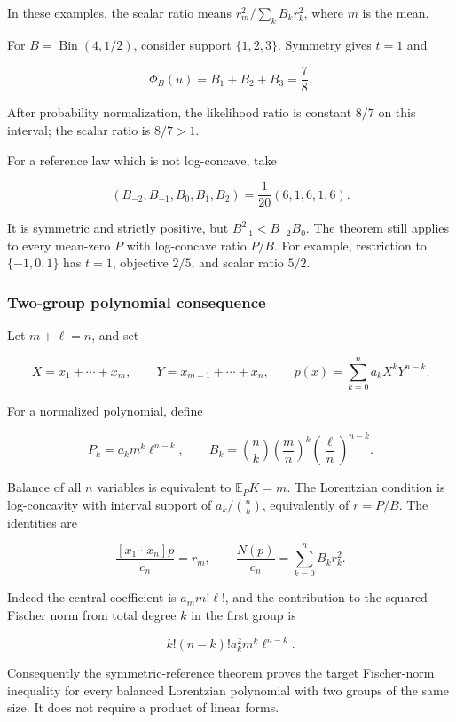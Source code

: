 \documentclass[11pt,a4paper]{article}
\theoremstyle{definition}
\theoremstyle{remark}
\begin{document}
In these examples, the scalar ratio means \(r_m^2/\sum_k B_kr_k^2\), where \(m\) is the mean.

For \(B=\operatorname{Bin}(4,1/2)\), consider support \(\{1,2,3\}\).
Symmetry gives \(t=1\) and

\[
\Phi_B(u)=B_1+B_2+B_3=\frac78.
\]

After probability normalization, the likelihood ratio is constant
\(8/7\) on this interval; the scalar ratio is \(8/7>1\).

For a reference law which is not log-concave, take

\[
(B_{-2},B_{-1},B_0,B_1,B_2)
=\frac1{20}(6,1,6,1,6).
\]

It is symmetric and strictly positive, but \(B_{-1}^2<B_{-2}B_0\). The
theorem still applies to every mean-zero \(P\) with log-concave ratio
\(P/B\). For example, restriction to \(\{-1,0,1\}\) has \(t=1\),
objective \(2/5\), and scalar ratio \(5/2\).

\subsubsection{Two-group polynomial
consequence}\label{scalar-two-group-polynomial-consequence}

Let \(m+\ell=n\), and set

\[
X=x_1+\cdots+x_m,\qquad
Y=x_{m+1}+\cdots+x_n,\qquad
p(x)=\sum_{k=0}^n a_kX^kY^{n-k}.
\]

For a normalized polynomial, define

\[
P_k=a_km^k\ell^{n-k},\qquad
B_k=\binom nk\left(\frac mn\right)^k
\left(\frac\ell n\right)^{n-k}.
\]

Balance of all \(n\) variables is equivalent to \(\mathbb E_PK=m\). The
Lorentzian condition is log-concavity with interval support of
\(a_k/\binom nk\), equivalently of \(r=P/B\). The identities are

\begin{equation}\label{eq:s-11}
\frac{[x_1\cdots x_n]p}{c_n}=r_m,
\qquad
\frac{N(p)}{c_n}=\sum_{k=0}^nB_kr_k^2.
\end{equation}

Indeed the central coefficient is \(a_m m!\ell!\), and the contribution
to the squared Fischer norm from total degree \(k\) in the first group is

\[
k!(n-k)!a_k^2m^k\ell^{n-k}.
\]

Consequently the symmetric-reference theorem proves the target
Fischer-norm inequality for every balanced Lorentzian polynomial with
two groups of the same size. It does not require a product of linear
forms.
\end{document}
